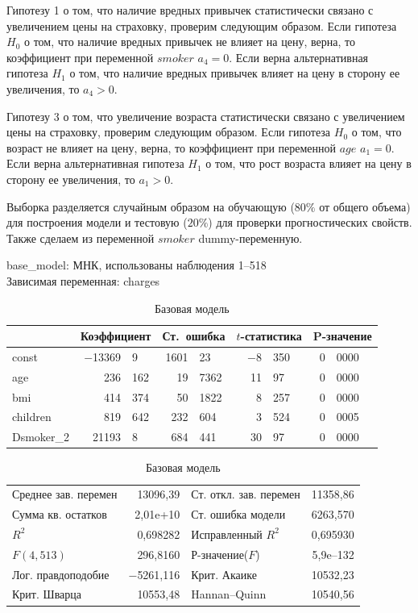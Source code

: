 \documentclass[a4paper,12pt]{article}
\begin{document}
Гипотезу 1 о том, что наличие вредных привычек статистически связано с увеличением цены на страховку, проверим следующим образом. Если гипотеза $H_0$ о том, что наличие вредных привычек не влияет на цену, верна, то коэффициент при переменной $smoker$ $a_4 = 0$. Если верна альтернативная гипотеза $H_1$ о том, что наличие вредных привычек влияет на цену в сторону ее увеличения, то $a_4 > 0$.

Гипотезу 3 о том, что увеличение возраста статистически связано с увеличением цены на страховку, проверим следующим образом. Если гипотеза $H_0$ о том, что возраст не влияет на цену, верна, то коэффициент при переменной $age$ $a_1 = 0$. Если верна альтернативная гипотеза $H_1$ о том, что рост возраста влияет на цену в сторону ее увеличения, то $a_1 > 0$.

Выборка разделяется случайным образом на обучающую ($80\%$ от общего объема) для построения модели и тестовую ($20\%$) для проверки прогностических свойств. Также сделаем из переменной $smoker$ dummy-переменную.

\begin{table}[H]
\begin{center}
	base\_model:
	МНК, использованы наблюдения 1--518\\
	Зависимая переменная: charges\\
	\vspace{1em}	
	\begin{tabular}{|l|r@{,}l|r@{,}l|r@{,}l|r@{,}l|}
		\hline
		&
		\multicolumn{2}{c|}{Коэффициент} &
		\multicolumn{2}{c|}{Ст.\ ошибка} &
		\multicolumn{2}{c|}{$t$-статистика} &
		\multicolumn{2}{c|}{P-значение} \\[1ex]
		\hline
		const & $-$13369&9 & 1601&23 & $-$8&350 & 0&0000 \\
		\hline
		age & 236&162 &	19&7362 & 11&97 & 0&0000 \\
		\hline
		bmi & 414&374 &	50&1822 & 8&257 & 0&0000 \\
		\hline
		children & 819&642 & 232&604 & 3&524 & 0&0005 \\
		\hline
		Dsmoker\_2 & 21193&8 & 684&441 & 30&97 & 0&0000 \\
		\hline
	\end{tabular}	
	\vspace{1ex}
	\begin{tabular}{lrlr}
		Среднее зав. перемен &  13096,39 & Ст. откл. зав. перемен &  11358,86 \\
		Сумма кв. остатков &  2,01\textrm{e+10} & Ст. ошибка модели &  6263,570 \\
		$R^2$ &  0,698282 & Исправленный $R^2$ &  0,695930 \\
		$F(4, 513)$ &  296,8160 & Р-значение($F$) &  5,9\textrm{e--132} \\
		Лог. правдоподобие & $-$5261,116 & Крит. Акаике &  10532,23 \\
		Крит. Шварца &  10553,48 & Hannan--Quinn &  10540,56 \\
	\end{tabular}
\caption{Базовая модель}
\label{tab:base}	
\end{center}
\end{table}
\end{document}
